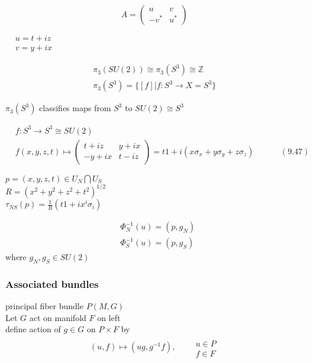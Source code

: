 \documentclass[twoside]{amsart}
\begin{document}
\[
A = \left( \begin{matrix} u & v \\ 
  -v^* & u^* \end{matrix} \right)
\]

$\begin{aligned}
  & u = t+iz \\
  & v = y + ix \end{aligned}$

\[
\begin{gathered}
  \pi_3(SU(2)) \cong \pi_3(S^3) \cong \mathbb{Z} \\ 
  \pi_3(S^3) = \lbrace [f] | f: S^3 \to X = S^3 \rbrace
\end{gathered}
\]

$\pi_3(S^3)$ classifies maps from $S^3$ to $SU(2) \cong S^3$


\begin{equation}
  \begin{aligned}
    & f:S^3 \to S^3 \cong SU(2) \\ 
    & f(x,y,z,t) \mapsto \left( \begin{matrix} t + iz & y + ix \\ 
      -y +ix & t-iz \end{matrix} \right) = t1 + i (x \sigma_x + y \sigma_y + z \sigma_z ) \quad \quad \quad \, (9.47)
\end{aligned}
\end{equation}

$p = (x,y,z,t) \in U_N \bigcap U_S$ \\
$R = (x^2 + y^2 + z^2 + t^2)^{1/2}$ \\

$\tau_{NS}{(p)} = \frac{1}{R}(t1 + ix^i \sigma_i)$

\[
\begin{aligned}
  & \Phi_N^{-1}(u) = (p,g_N) \\ 
  & \Phi_S^{-1}(u) = (p,g_S)
\end{aligned}
\]
where $g_N, g_S \in SU(2)$



\subsubsection{ Associated bundles }

principal fiber bundle $P(M,G)$ \\
Let $G$ act on manifold $F$ on left  \\

define action of $g \in G$ on $P\times F$ by 
\[
(u,f) \mapsto (ug, g^{-1}f), \quad \, \begin{aligned} & \quad \\
  & u \in P \\
& f \in F \end{aligned}
\]
\end{document}
